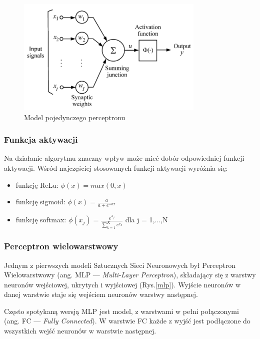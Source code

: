 \begin{figure}[h]
  \centering
  \includegraphics[width=0.8\textwidth]{img/neuron.png}
  \caption{Model pojedynczego perceptronu}
  \label{neuron}
\end{figure}


\subsubsection{Funkcja aktywacji}
Na działanie algorytmu znaczny wpływ może mieć dobór odpowiedniej 
funkcji aktywacji. Wśród najczęściej stosowanych funkcji aktywacji
wyróżnia się:
\begin{itemize}
    \item funkcję ReLu: $\phi(x) = max(0, x)$
    \item funkcję sigmoid: $\phi(x) = \frac{a}{a + e^{-bx}}$
    \item funkcję softmax: $\phi(x_j) = \frac{e^{x_j}}{\sum_{k=1}^{K}{e^{x_k}}}$ dla j = 1,...,N
\end{itemize}

\subsubsection{Perceptron wielowarstwowy}
Jednym z pierwszych modeli Sztucznych Sieci Neuronowych był Perceptron
Wielowarstwowy (ang. MLP — \emph{Multi-Layer Perceptron}), składający 
się z warstwy neuronów wejściowej, ukrytych i wyjściowej (Rys.\ref{mlp}).
Wyjście neuronów w danej warstwie staje się wejściem neuronów warstwy następnej.

Często spotykaną wersją MLP jest model, z warstwami w pełni połączonymi
(ang. FC — \emph{Fully Connected}). W warstwie FC każde z wyjść jest podłączone do 
wszystkich wejść neuronów w warstwie następnej.

